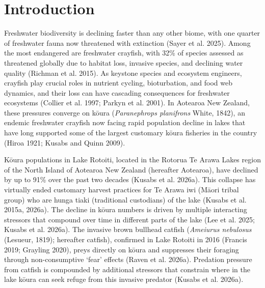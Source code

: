 \documentclass[
  12pt,
  a4paper,
  oneside]{scrbook}
\begin{document}
\section{Introduction}\label{introduction-3}

Freshwater biodiversity is declining faster than any other biome, with
one quarter of freshwater fauna now threatened with extinction (Sayer et
al. 2025). Among the most endangered are freshwater crayfish, with 32\%
of species assessed as threatened globally due to habitat loss, invasive
species, and declining water quality (Richman et al. 2015). As keystone
species and ecosystem engineers, crayfish play crucial roles in nutrient
cycling, bioturbation, and food web dynamics, and their loss can have
cascading consequences for freshwater ecosystems (Collier et al. 1997;
Parkyn et al. 2001). In Aotearoa New Zealand, these pressures converge
on kōura (\emph{Paranephrops planifrons} White, 1842), an endemic
freshwater crayfish now facing rapid population decline in lakes that
have long supported some of the largest customary kōura fisheries in the
country (Hiroa 1921; Kusabs and Quinn 2009).

Kōura populations in Lake Rotoiti, located in the Rotorua Te Arawa Lakes
region of the North Island of Aotearoa New Zealand (hereafter Aotearoa),
have declined by up to 91\% over the past two decades (Kusabs et al.
2026a). This collapse has virtually ended customary harvest practices
for Te Arawa iwi (Māori tribal group) who are hunga tiaki (traditional
custodians) of the lake (Kusabs et al. 2015a, 2026a). The decline in
kōura numbers is driven by multiple interacting stressors that compound
over time in different parts of the lake (Lee et al. 2025; Kusabs et al.
2026a). The invasive brown bullhead catfish (\emph{Ameiurus nebulosus}
(Lesueur, 1819); hereafter catfish), confirmed in Lake Rotoiti in 2016
(Francis 2019; Grayling 2020), preys directly on kōura and suppresses
their foraging through non-consumptive `fear' effects (Raven et al.
2026a). Predation pressure from catfish is compounded by additional
stressors that constrain where in the lake kōura can seek refuge from
this invasive predator (Kusabs et al. 2026a).
\end{document}
